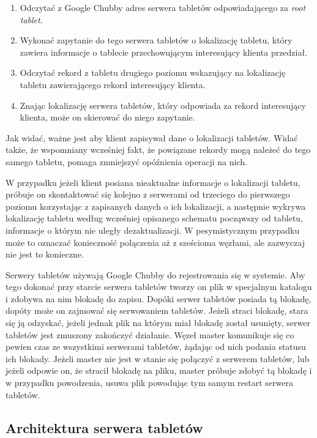 \begin{enumerate}
 \item Odczytać z Google Chubby adres serwera tabletów odpowiadającego za \emph{root tablet}.
 \item Wykonać zapytanie do tego serwera tabletów o lokalizację tabletu, który zawiera informacje o tablecie przechowującym interesujący klienta przedział.
 \item Odczytać rekord z tabletu drugiego poziomu wskazujący na lokalizację tabletu zawierającego rekord interesujący klienta.
 \item Znając lokalizację serwera tabletów, który odpowiada za rekord interesujący klienta, może on skierować do niego zapytanie.
\end{enumerate}

Jak widać, ważne jest aby klient zapisywał dane o lokalizacji tabletów.
Widać także, że wspomniany wcześniej fakt, że powiązane rekordy mogą należeć do tego samego tabletu, pomaga zmniejszyć opóźnienia operacji na nich.

W przypadku jeżeli klient posiana nieaktualne informacje o lokalizacji tabletu, próbuje on skontaktować się kolejno z serwerami od trzeciego do pierwszego poziomu korzystając z zapisanych danych o ich lokalizacji, a następnie wykrywa lokalizację tabletu według wcześniej opisanego schematu począwszy od tabletu, informacje o którym nie uległy dezaktualizacji.
W pesymistycznym przypadku może to oznaczać konieczność połączenia aż z sześcioma węzłami, ale zazwyczaj nie jest to konieczne.

Serwery tabletów używają Google Chubby do rejestrowania się w systemie.
Aby tego dokonać przy starcie serwera tabletów tworzy on plik w specjalnym katalogu i zdobywa na nim blokadę do zapisu.
Dopóki serwer tabletów posiada tą blokadę, dopóty może on zajmować się serwowaniem tabletów.
Jeżeli straci blokadę, stara się ją odzyskać, jeżeli jednak plik na którym miał blokadę został usunięty, serwer tabletów jest zmuszony zakończyć działanie.
Węzeł master komunikuje się co pewien czas ze wszystkimi serwerami tabletów, żądając od nich podania statusu ich blokady.
Jeżeli master nie jest w stanie się połączyć z serwerem tabletów, lub jeżeli odpowie on, że stracił blokadę na pliku, master próbuje zdobyć tą blokadę i w przypadku powodzenia, usuwa plik powodując tym samym restart serwera tabletów.

\subsection*{Architektura serwera tabletów}
\label{sec:bigtable-architektura-serwera-tabletow}

